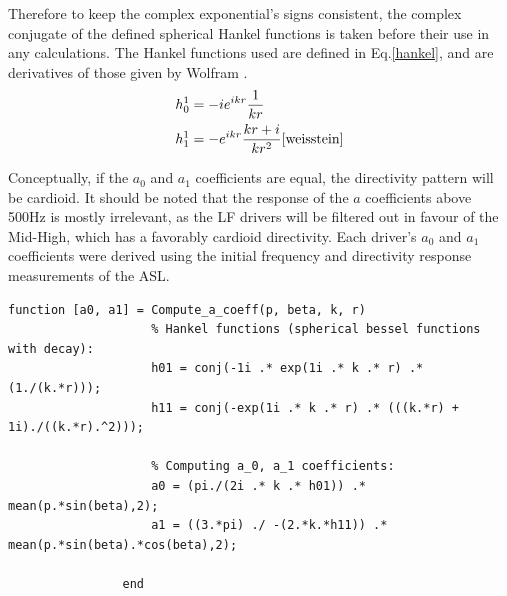 \documentclass{report}
\begin{document}
            Therefore to keep the complex exponential's signs consistent, the complex conjugate of the defined spherical Hankel functions is taken before their use in any calculations.
            The Hankel functions used are defined in Eq.\ref{hankel}, and are derivatives of those given by Wolfram \cite{weisstein}.
            \begin{equation}
                \begin{split}
                    h_0^1 &= -i  e^{ikr}  \frac{1}{kr} \\
                    h_1^1 &= -e^{ikr}  \frac{kr + i}{kr^2}
                    \label{hankel} \cite{weisstein}
                \end{split}
            \end{equation}

            Conceptually, if the $a_0$ and $a_1$ coefficients are equal, the directivity pattern will be cardioid.
            It should be noted that the response of the $a$ coefficients above 500Hz is mostly irrelevant, as the LF drivers will be filtered out in favour of the Mid-High, which has a favorably cardioid directivity.
            Each driver's $a_0$ and $a_1$ coefficients were derived using the initial frequency and directivity response measurements of the ASL.
            \begin{lstlisting}[style=Matlab-editor, gobble=16]
                function [a0, a1] = Compute_a_coeff(p, beta, k, r)
                    % Hankel functions (spherical bessel functions with decay):
                    h01 = conj(-1i .* exp(1i .* k .* r) .* (1./(k.*r)));
                    h11 = conj(-exp(1i .* k .* r) .* (((k.*r) + 1i)./((k.*r).^2)));

                    % Computing a_0, a_1 coefficients:
                    a0 = (pi./(2i .* k .* h01)) .* mean(p.*sin(beta),2);
                    a1 = ((3.*pi) ./ -(2.*k.*h11)) .* mean(p.*sin(beta).*cos(beta),2);
                
                end
            \end{lstlisting}
            
\end{document}
